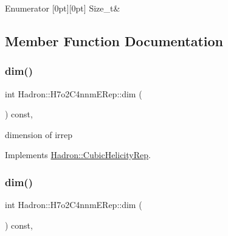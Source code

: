 \begin{DoxyEnumFields}{Enumerator}
[0pt][0pt]{}\mbox{\label{structHadron_1_1H7o2C4nnmERep_ad375f9fc791a6fff32945b0c11053478ae8262b80e586398f1ea7af4fc9272d82}} 
Size\+\_\+t&\\
\hline

\end{DoxyEnumFields}


\subsection{Member Function Documentation}
\mbox{\label{structHadron_1_1H7o2C4nnmERep_ac2a28af759178ce1d0cf8ec5bd772198}} 
\subsubsection{\texorpdfstring{dim()}{dim()}\hspace{0.1cm}{\footnotesize\ttfamily [1/3]}}
{\footnotesize\ttfamily int Hadron\+::\+H7o2\+C4nnm\+E\+Rep\+::dim (\begin{DoxyParamCaption}{ }\end{DoxyParamCaption}) const\hspace{0.3cm}{\ttfamily [inline]}, {\ttfamily [virtual]}}

dimension of irrep 

Implements \mbox{\hyperlink{structHadron_1_1CubicHelicityRep_a95d229a05580e65f8bdde74a1e316855}{Hadron\+::\+Cubic\+Helicity\+Rep}}.

\mbox{\label{structHadron_1_1H7o2C4nnmERep_ac2a28af759178ce1d0cf8ec5bd772198}} 
\subsubsection{\texorpdfstring{dim()}{dim()}\hspace{0.1cm}{\footnotesize\ttfamily [2/3]}}
{\footnotesize\ttfamily int Hadron\+::\+H7o2\+C4nnm\+E\+Rep\+::dim (\begin{DoxyParamCaption}{ }\end{DoxyParamCaption}) const\hspace{0.3cm}{\ttfamily [inline]}, {\ttfamily [virtual]}}

